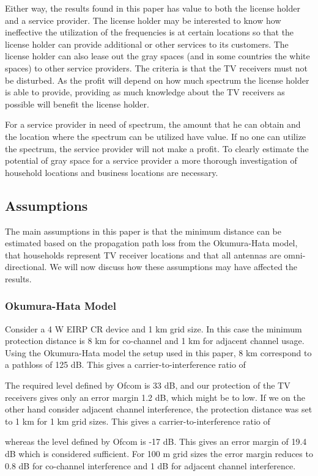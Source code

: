 \documentclass[journal,11pt,draftclsnofoot,onecolumn]{IEEEtran}
\begin{document}
Either way, the results found in this paper has value to both the license holder and a service provider. The license holder may be interested to know how ineffective the utilization of the frequencies is at certain locations so that the license holder can provide additional or other services to its customers. The license holder can also lease out the gray spaces (and in some countries the white spaces) to other service providers. The criteria is that the TV receivers must not be disturbed. As the profit will depend on how much spectrum the license holder is able to provide, providing as much knowledge about the TV receivers as possible will benefit the license holder.

For a service provider in need of spectrum, the amount that he can obtain and the location where the spectrum can be utilized have value. If no one can utilize the spectrum, the service provider will not make a profit. To clearly estimate the potential of gray space for a service provider a more thorough investigation of household locations and business locations are necessary.

\subsection{Assumptions}
The main assumptions in this paper is that the minimum distance can be estimated based on the propagation path loss from the Okumura-Hata model, that households represent TV receiver locations and that all antennas are omni-directional. We will now discuss how these assumptions may have affected the results.
\subsubsection{Okumura-Hata Model}
Consider a 4 W EIRP CR device and 1 km grid size. In this case the minimum protection distance is 8 km for co-channel and 1 km for adjacent channel usage. Using the Okumura-Hata model the setup used in this paper, 8 km correspond to a pathloss of 125 dB. This gives a carrier-to-interference ratio of

The required  level defined by Ofcom is 33 dB, and our protection of the TV receivers gives only an error margin 1.2 dB, which might be to low. If we on the other hand consider adjacent channel interference, the protection distance was set to 1 km for 1 km grid sizes. 
This gives a carrier-to-interference ratio of

whereas the  level defined by Ofcom is -17 dB. This gives an error margin of 19.4 dB which is considered sufficient. For 100 m grid sizes the error margin reduces to 0.8 dB for co-channel interference and 1 dB for adjacent channel interference. 
\end{document}
